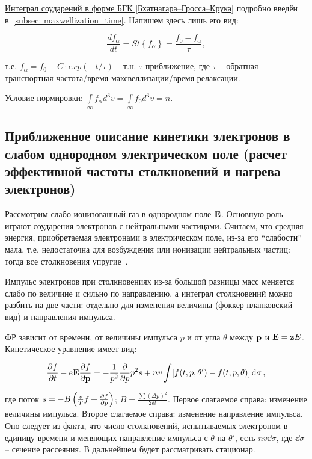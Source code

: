 \documentclass[10pt, a4paper]{article}
\begin{document}
\uline{Интеграл соударений в форме БГК [Бхатнагара–Гросса–Крука]} подробно введён в~\ref{subsec: maxwellization_time}. Напишем здесь лишь его вид:

\begin{equation} \label{eq:BGK_collision_term}
	\frac{df_\alpha}{dt} = St\left\lbrace f_\alpha\right\rbrace = \frac{f_0-f_\alpha}{\tau},
\end{equation}

т.е. $f_\alpha = f_0 + C\cdot exp(-t/\tau)$ -- т.н. $\tau$-приближение, где $\tau$ -- обратная транспортная частота/время максвеллизации/время релаксации.

Условие нормировки: $\int\limits_{\infty}f_\alpha d^3v =\int\limits_{\infty}f_0d^3v = n$.

\subsection{Приближенное описание кинетики электронов в слабом однородном электрическом поле (расчет эффективной частоты столкновений и нагрева электронов)} \label{subsec:kinetic_eff_freq}

Рассмотрим слабо ионизованный газ в однородном поле $\vb{E}$. Основную роль играют соударения электронов с нейтральными частицами. Считаем, что средняя энергия, приобретаемая электронами в электрическом поле, из-за его ``слабости'' мала, т.е. недостаточна для возбуждения или ионизации нейтральных частиц: тогда все столкновения упругие~\cite{landau10}.

Импульс электронов при столкновениях из-за большой разницы масс меняется слабо по величине и сильно по направлению, а интеграл столкновений можно разбить на две части: отдельно для изменения величины (фоккер-планковский вид) и направления импульса.

ФР зависит от времени, от величины импульса $p$ и от угла $\theta$ между $\vb{p}$ и $\vb{E} = \vb{z}E$. Кинетическое уравнение имеет вид:

\begin{equation*}
	\pdv{f}{t}-e\vb{E}\pdv{f}{\vb{p}} = -\frac{1}{p^2}\pdv{}{p}p^2s + nv\int[f(t, p, \theta')-f(t, p, \theta)]\dd{\sigma},
\end{equation*}

где поток $s = -B\left(\frac{v}{T}f+\pdv{f}{p}\right)$; $B = \frac{\sum(\Delta p)^2}{2\delta t}$. Первое слагаемое справа: изменение величины импульса. Второе слагаемое справа: изменение направление импульса. Оно следует из факта, что число столкновений, испытываемых электроном в единицу времени и меняющих направление импульса с $\theta$ на $\theta'$, есть $nv\dd{\sigma}$, где $\dd{\sigma}$ -- сечение рассеяния. В дальнейшем будет рассматривать стационар.
\end{document}
